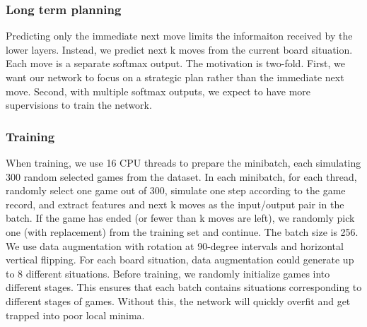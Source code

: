 \subsubsection{Long term planning}
Predicting only the immediate next move limits the informaiton received by the lower layers. Instead, we 
predict next k moves from the current board situation. Each move is a separate softmax output. The motivation
is two-fold. First, we want our network to focus on a strategic plan rather than the immediate next move. 
Second, with multiple softmax outputs, we expect to have more supervisions to train the network. 
\subsubsection{Training}
When training, we use 16 CPU threads to prepare the minibatch, each simulating 300 random selected
games from the dataset. In each minibatch, for each thread, randomly select one game out of
300, simulate one step according to the game record, and extract features and next k moves as the
input/output pair in the batch. If the game has ended (or fewer than k moves are left), we randomly
pick one (with replacement) from the training set and continue. The batch size is 256. We use data
augmentation with rotation at 90-degree intervals and horizontal vertical flipping. For each board
situation, data augmentation could generate up to 8 different situations.
Before training, we randomly initialize games into different stages. This ensures that each batch
contains situations corresponding to different stages of games. Without this, the network will quickly
overfit and get trapped into poor local minima.
